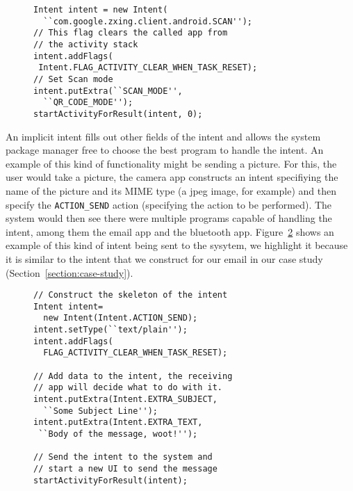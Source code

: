 \documentclass{acm_proc_article-sp}
\begin{document}
\begin{figure}
  \label{fig:qr-scanning-intent}
  \begin{lstlisting}
Intent intent = new Intent(
  ``com.google.zxing.client.android.SCAN'');
// This flag clears the called app from 
// the activity stack
intent.addFlags(
 Intent.FLAG_ACTIVITY_CLEAR_WHEN_TASK_RESET);
// Set Scan mode
intent.putExtra(``SCAN_MODE'', 
  ``QR_CODE_MODE'');
startActivityForResult(intent, 0);
  \end{lstlisting}
\end{figure}

An implicit intent fills out other fields of the intent
and allows the system package manager free to choose the best program
to handle the intent.  An example of this kind of functionality might
be sending a picture.  For this, the user would take a picture, the
camera app constructs an intent specifiying the name of the picture
and its MIME type (a jpeg image, for example) and then specify the
\texttt{ACTION\_SEND} action (specifying the action to be performed).  The
system would then see there were multiple programs capable of handling
the intent, among them the email app and the bluetooth app.
Figure~\ref{fig:share-intent} shows an example of this kind of intent
being sent to the sysytem, we highlight it because it is similar to
the intent that we construct for our email in our case study
(Section~\ref{section:case-study}).

\begin{figure}
  \label{fig:share-intent}
  \begin{lstlisting}
// Construct the skeleton of the intent
Intent intent=
  new Intent(Intent.ACTION_SEND);
intent.setType(``text/plain'');
intent.addFlags(
  FLAG_ACTIVITY_CLEAR_WHEN_TASK_RESET);

// Add data to the intent, the receiving
// app will decide what to do with it.
intent.putExtra(Intent.EXTRA_SUBJECT, 
  ``Some Subject Line'');
intent.putExtra(Intent.EXTRA_TEXT,
 ``Body of the message, woot!'');

// Send the intent to the system and
// start a new UI to send the message
startActivityForResult(intent);
\end{lstlisting}
\end{figure}
\end{document}
